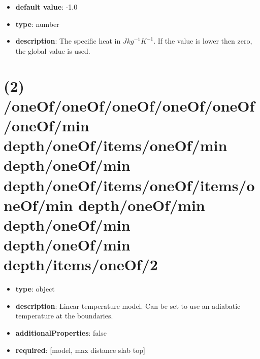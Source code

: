 \begin{itemize}[leftmargin=3em]\item {\bf default value}: -1.0
\item {\bf type}: number
\item {\bf description}: The specific heat in $J kg^{-1} K^{-1}$. If the value is lower then zero, the global value is used.
\end{itemize}\section{(2) /oneOf/oneOf/oneOf/oneOf/oneOf/oneOf/min depth/oneOf/items/oneOf/min depth/oneOf/min depth/oneOf/items/oneOf/items/oneOf/min depth/oneOf/min depth/oneOf/min depth/oneOf/min depth/items/oneOf/2}
\begin{itemize}[leftmargin=2em]\item {\bf type}: object
\item {\bf description}: Linear temperature model. Can be set to use an adiabatic temperature at the boundaries.
\item {\bf additionalProperties}: false
\item {\bf required}: [model, max distance slab top]\end{itemize}
